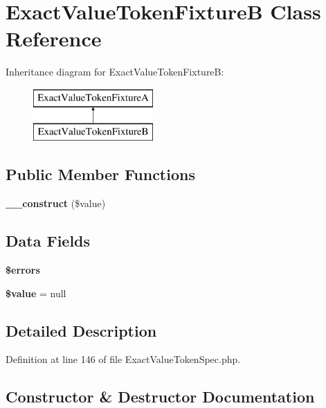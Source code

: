 \section{Exact\+Value\+Token\+Fixture\+B Class Reference}
\label{classspec_1_1_prophecy_1_1_argument_1_1_token_1_1_exact_value_token_fixture_b}
Inheritance diagram for Exact\+Value\+Token\+Fixture\+B\+:\begin{figure}[H]
\begin{center}
\leavevmode
\includegraphics[height=2.000000cm]{classspec_1_1_prophecy_1_1_argument_1_1_token_1_1_exact_value_token_fixture_b}
\end{center}
\end{figure}
\subsection*{Public Member Functions}
\begin{DoxyCompactItemize}
\item 
{\bf \+\_\+\+\_\+construct} (\$value)
\end{DoxyCompactItemize}
\subsection*{Data Fields}
\begin{DoxyCompactItemize}
\item 
{\bf \$errors}
\item 
{\bf \$value} = null
\end{DoxyCompactItemize}


\subsection{Detailed Description}


Definition at line 146 of file Exact\+Value\+Token\+Spec.\+php.



\subsection{Constructor \& Destructor Documentation}
